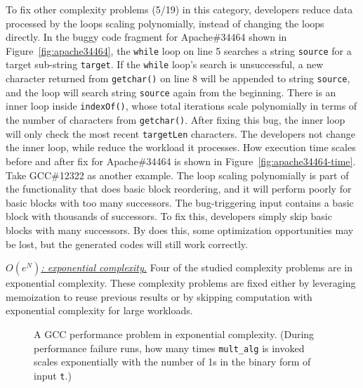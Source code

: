 To fix other complexity problems (5/19) in this category,
developers reduce data processed by the loops scaling polynomially, 
instead of changing the loops directly.
In the buggy code fragment for Apache\#34464 shown in Figure~\ref{fig:apache34464},
the \texttt{while} loop on line 5 searches a string \texttt{source}
for a target sub-string \texttt{target}.
If the \texttt{while} loop's search is unsuccessful, 
a new character returned from \texttt{getchar()} on line 8 will be appended to string \texttt{source}, 
and the loop will search string \texttt{source} again from the beginning. 
There is an inner loop inside \texttt{indexOf()}, whose total iterations 
scale polynomially in terms of the number of characters from \texttt{getchar()}. 
After fixing this bug, the inner loop will only check the most recent \texttt{targetLen} characters.
The developers not change the inner loop, 
while reduce the workload it processes.   
How execution time scales before and after fix for 
Apache\#34464 is shown in Figure~\ref{fig:apache34464-time}.
Take GCC\#12322 as another example.
The loop scaling polynomially is part of the functionality that does basic block reordering,
and it will perform poorly for basic blocks with too many successors. 
The bug-triggering input contains a basic block with thousands of successors. 
To fix this, developers simply skip basic blocks with many successors.
By does this, some optimization opportunities may be lost, 
but the generated codes will still work correctly. 


{\underline{\textit{$O(e^N)$: exponential complexity.}}}
Four of the studied complexity problems are in exponential complexity. 
These complexity problems are fixed 
either by leveraging memoization to reuse previous results 
or by skipping computation with exponential complexity for large workloads. 



\begin{figure}
\centering
{}
  \mbox{}
\caption{A GCC performance problem in exponential complexity. 
 \footnotesize{(During performance failure runs, how many times \texttt{mult\_alg} is invoked scales exponentially
  with the number of 1s in the binary form of input \texttt{t}.)}}
\vspace{-0.05in}
\label{fig:gcc27733}
\vspace{-0.05in}
\end{figure}


